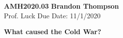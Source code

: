 \noindent
\textbf{AMH2020.03} \hfill \textbf{Brandon Thompson} \\
\normalsize Prof. Luck \hfill Due Date: 11/1/2020 \\

\begin{center}
\textbf{What caused the Cold War?}
\end{center}